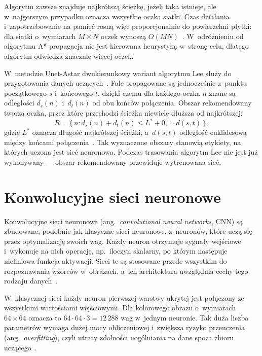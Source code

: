 Algorytm zawsze znajduje najkrótszą ścieżkę, jeżeli taka istnieje, ale
w~najgorszym przypadku oznacza wszystkie oczka siatki. Czas działania
i~zapotrzebowanie na pamięć rosną więc proporcjonalnie do powierzchni płytki:
dla siatki o~wymiarach $M \times N$ oczek wynoszą $O(MN)$~\cite{Zhou_EECS357_Lee}.
W~odróżnieniu od algorytmu A* propagacja nie jest kierowana heurystyką
w~stronę celu, dlatego algorytm odwiedza znacznie więcej oczek.

W~metodzie Unet-Astar dwukierunkowy wariant algorytmu Lee służy do
przygotowania danych uczących~\cite{Yin2023UnetAstar}. Fale propagowane są
jednocześnie z~punktu początkowego $s$ i~końcowego $t$, dzięki czemu dla
każdego oczka $n$ znane są odległości $d_s(n)$ i~$d_t(n)$ od obu końców
połączenia. Obszar rekomendowany tworzą oczka, przez które przechodzi
ścieżka niewiele dłuższa od najkrótszej:
\begin{equation}
  R = \{\, n : d_s(n) + d_t(n) \le L^* + 0{,}1 \cdot d(s, t) \,\},
  \label{eq:lee-obszar}
\end{equation}
gdzie $L^*$ oznacza długość najkrótszej ścieżki, a~$d(s,t)$ odległość
euklidesową między końcami połączenia~\cite{Yin2023UnetAstar}. Tak
wyznaczone obszary stanowią etykiety, na których uczona jest sieć
neuronowa. Podczas trasowania algorytm Lee nie jest już wykonywany ---
obszar rekomendowany przewiduje wytrenowana sieć.

\section{Konwolucyjne sieci neuronowe}

Konwolucyjne sieci neuronowe (ang.~\emph{convolutional neural networks}, CNN)
są zbudowane, podobnie jak klasyczne sieci neuronowe, z~neuronów, które
uczą się przez optymalizację swoich wag. Każdy neuron otrzymuje sygnały
wejściowe i~wykonuje na nich operację, np.~iloczyn skalarny, po którym
następuje nieliniowa funkcja aktywacji. Sieci te są stosowane przede
wszystkim do rozpoznawania wzorców w~obrazach, a~ich architektura
uwzględnia cechy tego rodzaju danych~\cite{OShea2015CNN}.

W~klasycznej sieci każdy neuron pierwszej warstwy ukrytej jest połączony
ze wszystkimi wartościami wejściowymi. Dla kolorowego obrazu o~wymiarach
$64 \times 64$ oznacza to $64 \cdot 64 \cdot 3 = 12\,288$ wag w~jednym
neuronie. Tak duża liczba parametrów wymaga dużej mocy obliczeniowej
i~zwiększa ryzyko przeuczenia (ang.~\emph{overfitting}), czyli utraty
zdolności uogólniania na dane spoza zbioru uczącego~\cite{OShea2015CNN}.

